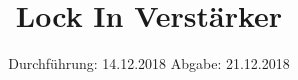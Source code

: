 

\subject{V303}
\title{Lock In Verstärker}
\date{
  Durchführung: 14.12.2018
  \hspace{3em}
  Abgabe: 21.12.2018
}



\maketitle
\thispagestyle{empty}
\tableofcontents
\newpage







\printbibliography{}

